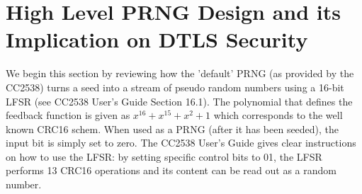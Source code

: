 \section{High Level PRNG Design and its Implication on DTLS Security} \label{LFSR}
We begin this section by reviewing how the 'default' PRNG (as provided by the CC2538) turns a seed into a stream of pseudo random numbers using a 16-bit LFSR (see CC2538 User's Guide\cite{CC2538Manual} Section 16.1). The polynomial that defines the feedback function is given as $x^{16} + x^{15} + x^{2} + 1$ which corresponds to the well known CRC16 schem\cite{CRC}. When used as a PRNG (after it has been seeded), the input bit is simply set to zero. The CC2538 User's Guide\cite{CC2538Manual} gives clear instructions on how to use the LFSR: by setting specific control bits to 01, the LFSR performs 13 CRC16 operations and its content can be read out as a random number. 






